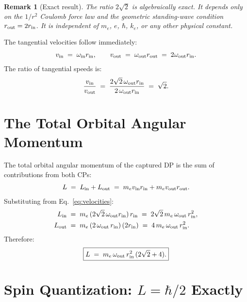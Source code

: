 \documentclass[12pt]{article}
\newtheorem{remark}[theorem]{Remark}
\newcommand{\rin}{r_{\rm in}}
\newcommand{\rout}{r_{\rm out}}
\newcommand{\oin}{\omega_{\rm in}}
\newcommand{\oout}{\omega_{\rm out}}
\begin{document}
\begin{remark}[Exact result]
The ratio $2\sqrt{2}$ is algebraically exact.  It depends only on
the $1/r^2$ Coulomb force law and the geometric standing-wave
condition $\rout = 2\rin$.  It is independent of $m_e$, $e$, $\hbar$,
$k_e$, or any other physical constant.
\end{remark}

The tangential velocities follow immediately:
\begin{equation}
  v_{\rm in} \;=\; \oin\rin, \qquad
  v_{\rm out} \;=\; \oout\rout \;=\; 2\oout\rin.
  \label{eq:velocities}
\end{equation}
The ratio of tangential speeds is:
\begin{equation}
  \frac{v_{\rm in}}{v_{\rm out}}
  \;=\; \frac{2\sqrt{2}\,\oout\rin}{2\,\oout\rin}
  \;=\; \sqrt{2}.
  \label{eq:v_ratio}
\end{equation}

\section{The Total Orbital Angular Momentum}
\label{sec:angmom}

The total orbital angular momentum of the captured DP is the sum of
contributions from both CPs:
\begin{equation}
  L \;=\; L_{\rm in} + L_{\rm out}
  \;=\; m_e v_{\rm in}\rin + m_e v_{\rm out}\rout.
  \label{eq:L_sum}
\end{equation}
Substituting from Eq.~\eqref{eq:velocities}:
\begin{align}
  L_{\rm in} &\;=\; m_e\,(2\sqrt{2}\,\oout\rin)\,\rin
  \;=\; 2\sqrt{2}\,m_e\,\oout\,\rin^2, \notag\\
  L_{\rm out} &\;=\; m_e\,(2\,\oout\,\rin)\,(2\rin)
  \;=\; 4\,m_e\,\oout\,\rin^2.
  \label{eq:L_parts}
\end{align}
Therefore:
\begin{equation}
  \boxed{L \;=\; m_e\,\oout\,\rin^2\,(2\sqrt{2}+4).}
  \label{eq:L_total}
\end{equation}

\section{Spin Quantization: $L = \hbar/2$ Exactly}
\label{sec:quantization}
\end{document}

